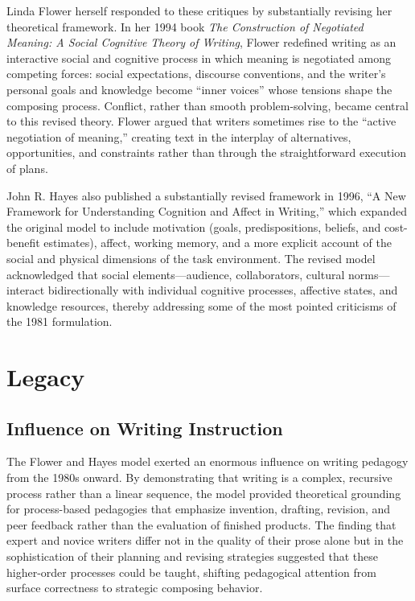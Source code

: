 \documentclass[12pt]{article}
\begin{document}
Linda Flower herself responded to these critiques by substantially revising her theoretical framework. In her 1994 book \textit{The Construction of Negotiated Meaning: A Social Cognitive Theory of Writing}, Flower redefined writing as an interactive social and cognitive process in which meaning is negotiated among competing forces: social expectations, discourse conventions, and the writer's personal goals and knowledge become ``inner voices'' whose tensions shape the composing process. Conflict, rather than smooth problem-solving, became central to this revised theory. Flower argued that writers sometimes rise to the ``active negotiation of meaning,'' creating text in the interplay of alternatives, opportunities, and constraints rather than through the straightforward execution of plans.

John R. Hayes also published a substantially revised framework in 1996, ``A New Framework for Understanding Cognition and Affect in Writing,'' which expanded the original model to include motivation (goals, predispositions, beliefs, and cost-benefit estimates), affect, working memory, and a more explicit account of the social and physical dimensions of the task environment. The revised model acknowledged that social elements---audience, collaborators, cultural norms---interact bidirectionally with individual cognitive processes, affective states, and knowledge resources, thereby addressing some of the most pointed criticisms of the 1981 formulation.

\section{Legacy}

\subsection{Influence on Writing Instruction}

The Flower and Hayes model exerted an enormous influence on writing pedagogy from the 1980s onward. By demonstrating that writing is a complex, recursive process rather than a linear sequence, the model provided theoretical grounding for process-based pedagogies that emphasize invention, drafting, revision, and peer feedback rather than the evaluation of finished products. The finding that expert and novice writers differ not in the quality of their prose alone but in the sophistication of their planning and revising strategies suggested that these higher-order processes could be taught, shifting pedagogical attention from surface correctness to strategic composing behavior.
\end{document}
